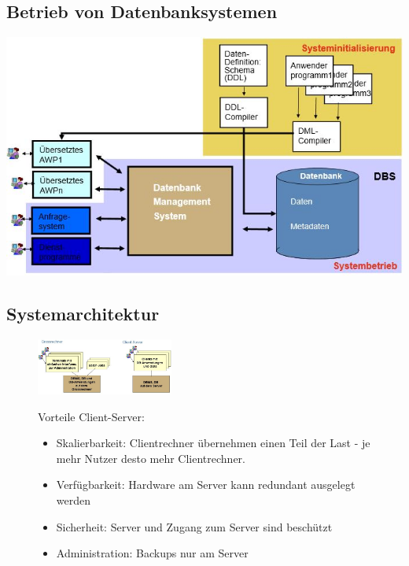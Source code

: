 \documentclass[10pt]{scrartcl}
\begin{document}
\subsection{Betrieb von Datenbanksystemen}
\includegraphics[width=1\textwidth]{img/betrieb-dbs.jpg}

\subsection{Systemarchitektur}




\begin{figure}
  \begin{center}
    \includegraphics[width=0.4\textwidth]{img/sysarc-1.jpg}
  \end{center}
Vorteile Client-Server:
\begin{itemize}
\item Skalierbarkeit: Clientrechner übernehmen einen Teil der Last - je mehr Nutzer desto mehr Clientrechner.
\item Verfügbarkeit: Hardware am Server kann redundant ausgelegt werden
\item Sicherheit: Server und Zugang zum Server sind beschützt
\item Administration: Backups nur am Server
\end{itemize}
\end{figure}
\end{document}
